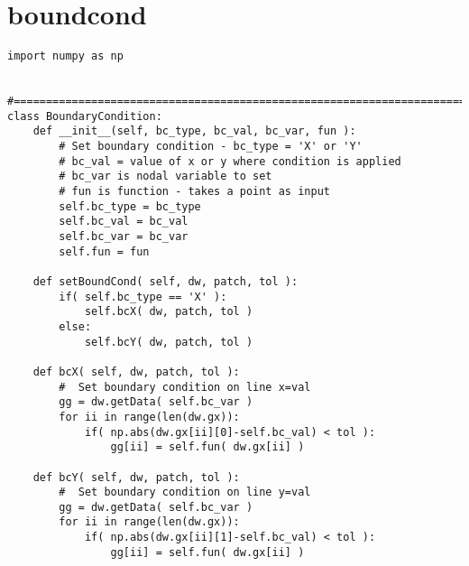 \chapter{boundcond}
\label{chap:boundcond}
\begin{lstlisting}
import numpy as np


#===============================================================================
class BoundaryCondition:
    def __init__(self, bc_type, bc_val, bc_var, fun ):
        # Set boundary condition - bc_type = 'X' or 'Y'
        # bc_val = value of x or y where condition is applied
        # bc_var is nodal variable to set
        # fun is function - takes a point as input
        self.bc_type = bc_type
        self.bc_val = bc_val
        self.bc_var = bc_var
        self.fun = fun
        
    def setBoundCond( self, dw, patch, tol ):
        if( self.bc_type == 'X' ):
            self.bcX( dw, patch, tol )
        else:
            self.bcY( dw, patch, tol )
        
    def bcX( self, dw, patch, tol ):
        #  Set boundary condition on line x=val
        gg = dw.getData( self.bc_var )
        for ii in range(len(dw.gx)):
            if( np.abs(dw.gx[ii][0]-self.bc_val) < tol ):
                gg[ii] = self.fun( dw.gx[ii] )
                
    def bcY( self, dw, patch, tol ):
        #  Set boundary condition on line y=val
        gg = dw.getData( self.bc_var )
        for ii in range(len(dw.gx)):
            if( np.abs(dw.gx[ii][1]-self.bc_val) < tol ):
                gg[ii] = self.fun( dw.gx[ii] )                
\end{lstlisting}
